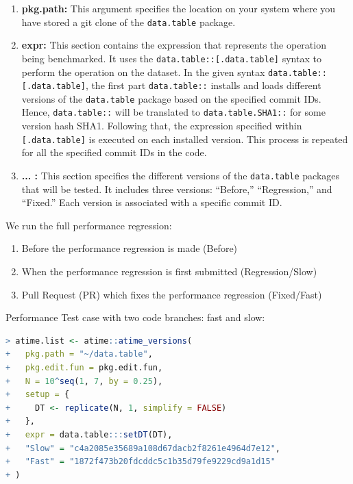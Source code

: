 \begin{enumerate}
    \item \textbf{pkg.path:} This argument specifies the location on your system where you have stored a git clone of the \texttt{data.table} package.
       
    \item \textbf{expr:} This section contains the expression that represents the operation being benchmarked. It uses the \texttt{data.table::[.data.table]} syntax to perform the operation on the dataset. In the given syntax \texttt{data.table::[.data.table]}, the first part \texttt{data.table::} installs and loads different versions of the \texttt{data.table} package based on the specified commit IDs. Hence, \texttt{data.table::} will be translated to \texttt{data.table.SHA1::} for some version hash SHA1. Following that, the expression specified within \texttt{[.data.table]} is executed on each installed version. This process is repeated for all the specified commit IDs in the code.
 
    \item \textbf{... :} This section specifies the different versions of the \texttt{data.table} packages that will be tested. It includes three versions: ``Before,'' ``Regression,'' and ``Fixed.'' Each version is associated with a specific commit ID.
\end{enumerate}

We run the full performance regression:

\begin{enumerate}
    \item Before the performance regression is made (Before)
    \item When the performance regression is first submitted (Regression/Slow)
    \item Pull Request (PR) which fixes the performance regression (Fixed/Fast)
\end{enumerate}


\noindent Performance Test case with two code branches: fast and slow:\\

\begin{lstlisting}[language=R]
> atime.list <- atime::atime_versions(
+   pkg.path = "~/data.table",
+   pkg.edit.fun = pkg.edit.fun,
+   N = 10^seq(1, 7, by = 0.25),
+   setup = { 
+     DT <- replicate(N, 1, simplify = FALSE)
+   },
+   expr = data.table:::setDT(DT),
+   "Slow" = "c4a2085e35689a108d67dacb2f8261e4964d7e12",
+   "Fast" = "1872f473b20fdcddc5c1b35d79fe9229cd9a1d15"
+ )
\end{lstlisting}

